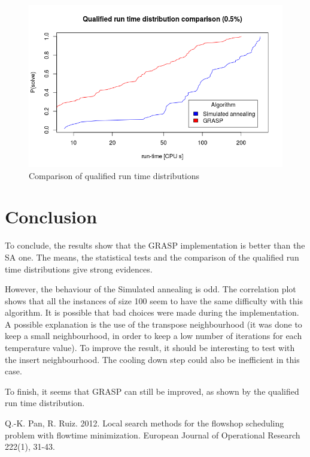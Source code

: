 \documentclass{article}
\begin{document}
\begin{figure}
    \centering
        \includegraphics[scale=0.5]{images/rt_comp}
    \caption{Comparison of qualified run time distributions}
    \label{fig:rt_comp}
\end{figure}


\section{Conclusion}

To conclude, the results show that the GRASP implementation is better than the SA one.
The means, the statistical tests and the comparison of the qualified run time distributions give strong evidences.\newline

However, the behaviour of the Simulated annealing is odd.
The correlation plot shows that all the instances of size 100 seem to have the same difficulty with this algorithm.
It is possible that bad choices were made during the implementation.
A possible explanation is the use of the transpose neighbourhood (it was done to keep a small neighbourhood, in order to keep a low number of iterations for each temperature value).
To improve the result, it should be interesting to test with the insert neighbourhood.
The cooling down step could also be inefficient in this case.\newline

To finish, it seems that GRASP can still be improved, as shown by the qualified run time distribution.


\begin{thebibliography}{12}

 Q.-K. Pan, R. Ruiz.
2012.
Local search methods for the flowshop scheduling problem with flowtime minimization.
European Journal of Operational Research 222(1), 31-43.

\end{thebibliography}
\end{document}
